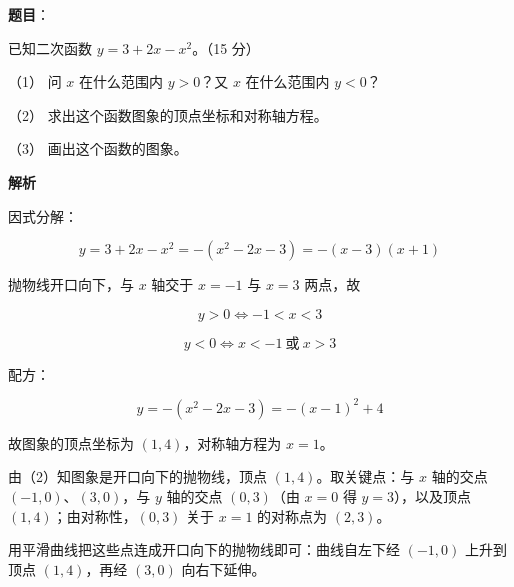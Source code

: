 \begin{answer}

\textbf{题目}：

已知二次函数 $y=3+2x-x^{2}$。（15 分）

（1） 问 $x$ 在什么范围内 $y>0$？又 $x$ 在什么范围内 $y<0$？

（2） 求出这个函数图象的顶点坐标和对称轴方程。

（3） 画出这个函数的图象。

\textbf{解析}


因式分解：

\nopagebreak[4]
\[
y=3+2x-x^{2}=-(x^{2}-2x-3)=-(x-3)(x+1)
\]

抛物线开口向下，与 $x$ 轴交于 $x=-1$ 与 $x=3$ 两点，故

\nopagebreak[4]
\[
y>0\iff -1<x<3
\]

\nopagebreak[4]
\[
y<0\iff x<-1\ \text{或}\ x>3
\]


配方：

\nopagebreak[4]
\[
y=-(x^{2}-2x-3)=-(x-1)^{2}+4
\]

故图象的顶点坐标为 $(1,4)$，对称轴方程为 $x=1$。


由（2）知图象是开口向下的抛物线，顶点 $(1,4)$。取关键点：与 $x$ 轴的交点 $(-1,0)$、$(3,0)$，与 $y$ 轴的交点 $(0,3)$（由 $x=0$ 得 $y=3$），以及顶点 $(1,4)$；由对称性，$(0,3)$ 关于 $x=1$ 的对称点为 $(2,3)$。

用平滑曲线把这些点连成开口向下的抛物线即可：曲线自左下经 $(-1,0)$ 上升到顶点 $(1,4)$，再经 $(3,0)$ 向右下延伸。




\end{answer}


